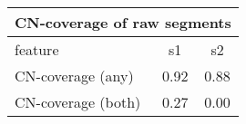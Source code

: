 \documentclass{standalone}
\begin{document}
\begin{tabular}{|l|c|c|}
\hline
\multicolumn{3}{|c|}{\textbf{CN-coverage of raw segments}}\\
\hline 

feature & s1 & s2 \\
\hline
CN-coverage (any) & 0.92 & 0.88 \\
CN-coverage (both) & 0.27 & 0.00 \\
\hline
\end{tabular}
\end{document}

